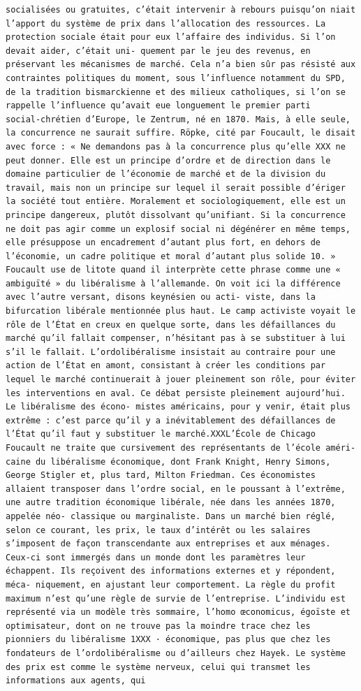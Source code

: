 \documentclass[
  letterpaper,
  DIV=11,
  numbers=noendperiod]{scrreprt}
\begin{document}
\begin{verbatim}
socialisées ou gratuites, c’était intervenir à rebours puisqu’on niait l’apport du système de prix dans l’allocation des ressources. La protection sociale était pour eux l’affaire des individus. Si l’on devait aider, c’était uni‑ quement par le jeu des revenus, en préservant les mécanismes de marché. Cela n’a bien sûr pas résisté aux contraintes politiques du moment, sous l’influence notamment du SPD, de la tradition bismarckienne et des milieux catholiques, si l’on se rappelle l’influence qu’avait eue longuement le premier parti social‑chrétien d’Europe, le Zentrum, né en 1870. Mais, à elle seule, la concurrence ne saurait suffire. Röpke, cité par Foucault, le disait avec force : « Ne demandons pas à la concurrence plus qu’elle XXX ne peut donner. Elle est un principe d’ordre et de direction dans le domaine particulier de l’économie de marché et de la division du travail, mais non un principe sur lequel il serait possible d’ériger la société tout entière. Moralement et sociologiquement, elle est un principe dangereux, plutôt dissolvant qu’unifiant. Si la concurrence ne doit pas agir comme un explosif social ni dégénérer en même temps, elle présuppose un encadrement d’autant plus fort, en dehors de l’économie, un cadre politique et moral d’autant plus solide 10. » Foucault use de litote quand il interprète cette phrase comme une « ambiguïté » du libéralisme à l’allemande. On voit ici la différence avec l’autre versant, disons keynésien ou acti‑ viste, dans la bifurcation libérale mentionnée plus haut. Le camp activiste voyait le rôle de l’État en creux en quelque sorte, dans les défaillances du marché qu’il fallait compenser, n’hésitant pas à se substituer à lui s’il le fallait. L’ordolibéralisme insistait au contraire pour une action de l’État en amont, consistant à créer les conditions par lequel le marché continuerait à jouer pleinement son rôle, pour éviter les interventions en aval. Ce débat persiste pleinement aujourd’hui. Le libéralisme des écono‑ mistes américains, pour y venir, était plus extrême : c’est parce qu’il y a inévitablement des défaillances de l’État qu’il faut y substituer le marché.XXXL’École de Chicago Foucault ne traite que cursivement des représentants de l’école améri‑ caine du libéralisme économique, dont Frank Knight, Henry Simons, George Stigler et, plus tard, Milton Friedman. Ces économistes allaient transposer dans l’ordre social, en le poussant à l’extrême, une autre tradition économique libérale, née dans les années 1870, appelée néo‑ classique ou marginaliste. Dans un marché bien réglé, selon ce courant, les prix, le taux d’intérêt ou les salaires s’imposent de façon transcendante aux entreprises et aux ménages. Ceux‑ci sont immergés dans un monde dont les paramètres leur échappent. Ils reçoivent des informations externes et y répondent, méca‑ niquement, en ajustant leur comportement. La règle du profit maximum n’est qu’une règle de survie de l’entreprise. L’individu est représenté via un modèle très sommaire, l’homo œconomicus, égoïste et optimisateur, dont on ne trouve pas la moindre trace chez les pionniers du libéralisme 1XXX · économique, pas plus que chez les fondateurs de l’ordolibéralisme ou d’ailleurs chez Hayek. Le système des prix est comme le système nerveux, celui qui transmet les informations aux agents, qui 
\end{verbatim}
\end{document}
